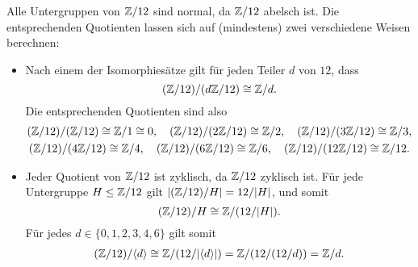 Alle Untergruppen von $\mathbb{Z}/12$ sind normal, da $\mathbb{Z}/12$ abelsch ist.
Die entsprechenden Quotienten lassen sich auf (mindestens) zwei verschiedene Weisen berechnen:

\begin{itemize}
  \item
    Nach einem der Isomorphiesätze gilt für jeden Teiler $d$ von $12$, dass
    \[
            (\mathbb{Z}/12) / (d\mathbb{Z}/12) \cong \mathbb{Z}/d.
    \]
    Die entsprechenden Quotienten sind also
    \begin{gather*}
      (\mathbb{Z}/12) / (\mathbb{Z}/12)   \cong \mathbb{Z}/1 \cong 0,
      \quad
      (\mathbb{Z}/12) / (2\mathbb{Z}/12)  \cong \mathbb{Z}/2,
      \quad
      (\mathbb{Z}/12) / (3\mathbb{Z}/12)  \cong \mathbb{Z}/3,
    \\
      (\mathbb{Z}/12) / (4\mathbb{Z}/12)  \cong \mathbb{Z}/4,
      \quad
      (\mathbb{Z}/12) / (6\mathbb{Z}/12)  \cong \mathbb{Z}/6,
      \quad
      (\mathbb{Z}/12) / (12\mathbb{Z}/12) \cong \mathbb{Z}/12.
    \end{gather*}
  \item
    Jeder Quotient von $\mathbb{Z}/12$ ist zyklisch, da $\mathbb{Z}/12$ zyklisch ist.
    Für jede Untergruppe $H \leq \mathbb{Z}/12$ gilt $| (\mathbb{Z}/12)/H | = 12/|H|$, und somit
    \[
            (\mathbb{Z}/12)/H
      \cong \mathbb{Z}/( 12/|H| ).
    \]
    Für jedes $d \in \{0, 1, 2, 3, 4, 6\}$ gilt somit
    \begin{gather*}
            (\mathbb{Z}/12)/\langle d\rangle
      \cong \mathbb{Z}/(12/|\langle d\rangle|)
      =     \mathbb{Z}/(12/(12/d))
      =     \mathbb{Z}/d.
    \end{gather*}
\end{itemize}




